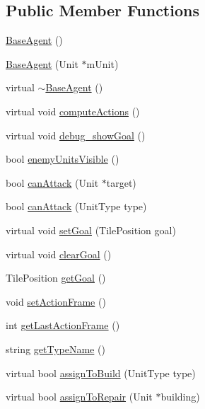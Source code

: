 \subsection*{Public Member Functions}
\begin{DoxyCompactItemize}
\item 
\hyperlink{class_base_agent_a479c84820c9602369e3e56161d5d4437}{Base\-Agent} ()
\item 
\hyperlink{class_base_agent_a700f7c3ecb4f21ed598053276a8a8276}{Base\-Agent} (Unit $\ast$m\-Unit)
\item 
virtual \hyperlink{class_base_agent_a726616004d0d1c1c0b3ed6577510a002}{$\sim$\-Base\-Agent} ()
\item 
virtual void \hyperlink{class_base_agent_a5b5a8bd2592ee1bb82254cf7e8423321}{compute\-Actions} ()
\item 
virtual void \hyperlink{class_base_agent_a58e65cf5df5e8db1973f177889e8c0cb}{debug\-\_\-show\-Goal} ()
\item 
bool \hyperlink{class_base_agent_a2b9755f279c4e8242acf91aa96c88715}{enemy\-Units\-Visible} ()
\item 
bool \hyperlink{class_base_agent_aab9406598b04c34b8f9c18b211457f05}{can\-Attack} (Unit $\ast$target)
\item 
bool \hyperlink{class_base_agent_a6ead79be31629f91e54c6b1171076416}{can\-Attack} (Unit\-Type type)
\item 
virtual void \hyperlink{class_base_agent_a404490fc9d2609f4ec56cda163383a7c}{set\-Goal} (Tile\-Position goal)
\item 
virtual void \hyperlink{class_base_agent_a58f73fcb862ba233f6a24492022a5f02}{clear\-Goal} ()
\item 
Tile\-Position \hyperlink{class_base_agent_a471a1f01fa28e9f1fa2b5bb86f6ab954}{get\-Goal} ()
\item 
void \hyperlink{class_base_agent_a82301b0f2195ed4d5f6c8d1dbb2fb417}{set\-Action\-Frame} ()
\item 
int \hyperlink{class_base_agent_a532608568d9beffea3ef0df09da4f33c}{get\-Last\-Action\-Frame} ()
\item 
string \hyperlink{class_base_agent_a521c6d21041e3452cd28a1bf6e9c4bbe}{get\-Type\-Name} ()
\item 
virtual bool \hyperlink{class_base_agent_a861a4564ef195eef8b91edad84230f65}{assign\-To\-Build} (Unit\-Type type)
\item 
virtual bool \hyperlink{class_base_agent_a26e1e72f340716be8f551bb357029c5b}{assign\-To\-Repair} (Unit $\ast$building)
\item 

\end{DoxyCompactItemize}
